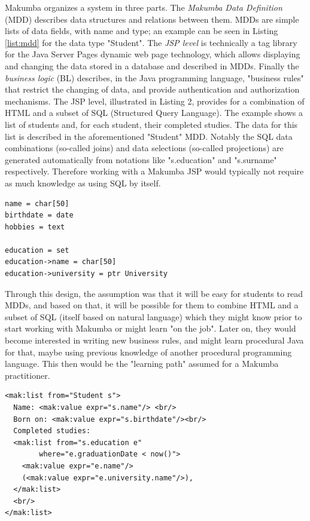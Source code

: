\documentclass{sig-alt-release2}
\begin{document}
Makumba organizes a system in three parts. The \textit{Makumba Data Definition} (MDD) describes data structures and relations between them. MDDs are simple lists of data fields, with name and type; an example can be seen in Listing \ref{list:mdd} for the data type "Student". The \textit{JSP level} is technically a tag library for the Java Server Pages dynamic web page technology, which allows displaying and changing the data stored in a database and described in MDDs. Finally the \textit{business logic} (BL) describes, in the Java programming language, %
"business rules" that restrict the changing of data, and provide authentication and authorization mechanisms. The JSP level, illustrated in Listing 2, provides for a combination of HTML and a subset of SQL (Structured Query Language). The example shows a list of students and, for each student, their completed studies. The data for this list is described in the aforementioned "Student" MDD. Notably the SQL data combinations (so-called joins) and data selections (so-called projections) are generated automatically from notations like "s.education" and "s.surname" respectively. Therefore working with a Makumba JSP would typically not require as much knowledge as using SQL by itself.

\lstset{basicstyle=\small, captionpos=b, caption=Makumba Data Definition "Student", label=list:mdd, frame=shadowbox}
\begin{lstlisting}
name = char[50]
birthdate = date
hobbies = text

education = set
education->name = char[50]
education->university = ptr University
\end{lstlisting}


Through this design, the assumption was that it will be easy for students to read MDDs, and based on that, it will be possible for them to combine HTML and a subset of SQL (itself based on natural language) which they might know prior to start working with Makumba or might learn "on the job". Later on, they would become interested in writing new business rules, and might learn procedural Java for that, maybe using previous knowledge of another procedural programming language. This then would be the "learning path" assumed for a Makumba practitioner.

\lstset{basicstyle=\small, captionpos=b, caption=Example of viewing data with the Makumba JSP tag library, label=list:mak, frame=shadowbox}
\begin{lstlisting}
<mak:list from="Student s">
  Name: <mak:value expr="s.name"/> <br/>
  Born on: <mak:value expr="s.birthdate"/><br/>
  Completed studies:
  <mak:list from="s.education e"
  	    where="e.graduationDate < now()">
    <mak:value expr="e.name"/>
    (<mak:value expr="e.university.name"/>),
  </mak:list>
  <br/>
</mak:list>
\end{lstlisting}
\end{document}
